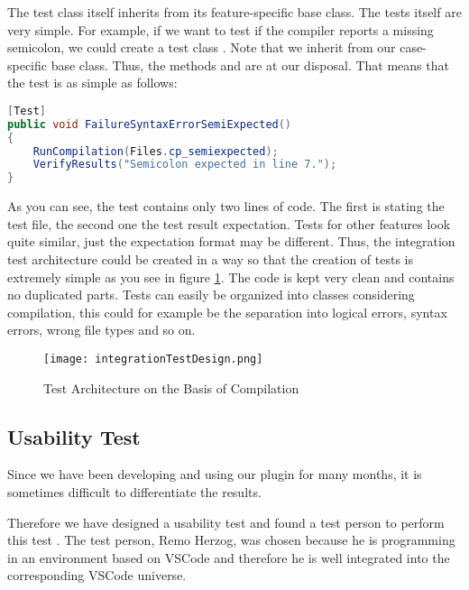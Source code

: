 The test class itself inherits from its feature-specific base class.
The tests itself are very simple.
For example, if we want to test if the compiler reports a missing semicolon, we could create a test class .
Note that we inherit from our case-specific base class.
Thus, the methods  and  are at our disposal.
That means that the test is as simple as follows:

\begin{lstlisting}[language=csharp, caption={Sample Test for Missing Semicolon}, captionpos=b, label={lst:demoTest}]
[Test]
public void FailureSyntaxErrorSemiExpected()
{
    RunCompilation(Files.cp_semiexpected);
    VerifyResults("Semicolon expected in line 7.");
}
\end{lstlisting}


As you can see, the test contains only two lines of code.
The first is stating the test file, the second one the test result expectation.
Tests for other features look quite similar, just the expectation format may be different.
Thus, the integration test architecture could be created in a way so that the creation of tests is extremely simple
as you see in figure \ref{fig:testArchitecture}.
The code is kept very clean and contains no duplicated parts.
Tests can easily be organized into classes \textendash{} considering compilation, this could for example be the separation into logical errors, syntax errors, wrong file types and so on.

\begin{figure}[H]
    \centering
    \texttt{[image: integrationTestDesign.png]}
    \caption{Test Architecture on the Basis of Compilation}
    \label{fig:testArchitecture}
\end{figure}


\subsection{Usability Test}
Since we have been developing and using our plugin for many months,
it is sometimes difficult to differentiate the results.

Therefore we have designed a usability test and found a test person to perform this test \cite{interview-remo}.
The test person, Remo Herzog, was chosen because he is programming in an environment based on VSCode
and therefore he is well integrated into the corresponding VSCode universe. \\

